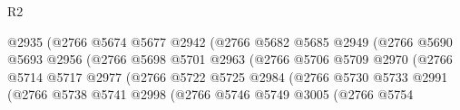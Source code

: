 \begin{lexlean}{R2}
\begin{coremodule}
                                            @2935
                                            (@2766
                                              @5674
                                              @5677
                                              @2942
                                              (@2766
                                                @5682
                                                @5685
                                                @2949
                                                (@2766
                                                  @5690
                                                  @5693
                                                  @2956
                                                  (@2766
                                                    @5698
                                                    @5701
                                                    @2963
                                                    (@2766
                                                      @5706
                                                      @5709
                                                      @2970
                                                      (@2766
                                                        @5714
                                                        @5717
                                                        @2977
                                                        (@2766
                                                          @5722
                                                          @5725
                                                          @2984
                                                          (@2766
                                                            @5730
                                                            @5733
                                                            @2991
                                                            (@2766
                                                              @5738
                                                              @5741
                                                              @2998
                                                              (@2766
                                                                @5746
                                                                @5749
                                                                @3005
                                                                (@2766
                                                                  @5754

\end{coremodule}
\end{lexlean}
